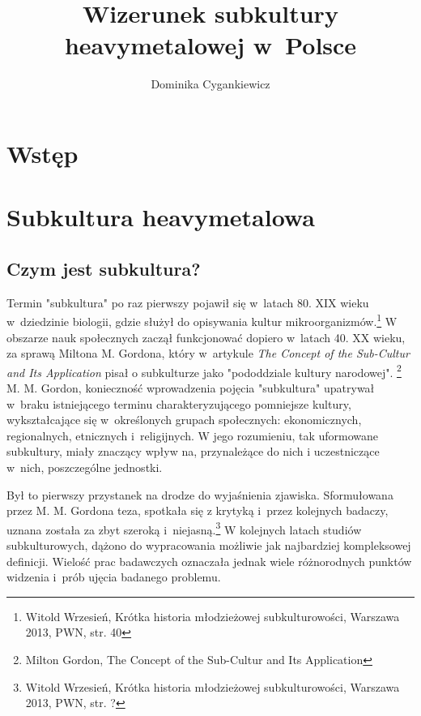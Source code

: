 \documentclass[12pt, a4paper, titlepage]{report}
\title{\textbf{Wizerunek subkultury heavymetalowej w~Polsce}}
\author{Dominika Cygankiewicz}
\date{}
\begin{document}
	
\maketitle
\tableofcontents
\thispagestyle {empty}
\newpage

\chapter*{Wstęp}

\chapter{Subkultura heavymetalowa}
\section{Czym jest subkultura?}
Termin "subkultura" po raz pierwszy pojawił się w~latach 80. XIX wieku w~dziedzinie biologii, gdzie służył do opisywania kultur mikroorganizmów.\footnote{Witold Wrzesień, Krótka historia młodzieżowej subkulturowości, Warszawa 2013, PWN, \break str. 40} W obszarze nauk społecznych zaczął funkcjonować dopiero w~latach 40. XX wieku, za sprawą Miltona M. Gordona, który w~artykule \textit{The Concept of the Sub-Cultur and Its Application} pisał o subkulturze jako "pododdziale kultury narodowej". \footnote{Milton Gordon, The Concept of the Sub-Cultur and Its Application} M. M. Gordon, konieczność wprowadzenia pojęcia "subkultura" upatrywał w~braku istniejącego terminu charakteryzującego pomniejsze kultury, wykształcające się w~określonych grupach społecznych: ekonomicznych, regionalnych, etnicznych i~religijnych. W jego rozumieniu, tak uformowane subkultury, miały znaczący wpływ na, przynależące do nich i uczestniczące w~nich, poszczególne jednostki.\footnotemark[\value{footnote}] %


Był to pierwszy przystanek na drodze do wyjaśnienia zjawiska. Sformułowana przez M. M. Gordona teza, spotkała się z krytyką i~przez kolejnych badaczy, uznana została za zbyt szeroką i~niejasną.\footnote{Witold Wrzesień, Krótka historia młodzieżowej subkulturowości, Warszawa 2013, PWN, \break str. ?} W kolejnych latach studiów subkulturowych, dążono do wypracowania możliwie jak najbardziej kompleksowej definicji. Wielość prac badawczych oznaczała jednak wiele różnorodnych punktów widzenia i~prób ujęcia badanego problemu. 
\end{document}
